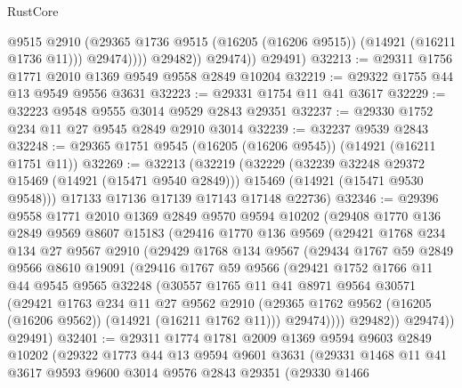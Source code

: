 \begin{lexlean}{RustCore}
\begin{coremodule}
                      @9515
                      @2910
                      (@29365 @1736 @9515 (@16205 (@16206 @9515)) (@14921 (@16211 @1736 @11)))
                      @29474))))
              @29482))
          @29474))
      @29491)
@32213 := @29311 @1756 @1771 @2010 @1369 @9549 @9558 @2849 @10204
@32219 := @29322 @1755 @44 @13 @9549 @9556 @3631
@32223 := @29331 @1754 @11 @41 @3617
@32229 := @32223 @9548 @9555 @3014 @9529 @2843 @29351
@32237 := @29330 @1752 @234 @11 @27 @9545 @2849 @2910 @3014
@32239 := @32237 @9539 @2843
@32248 := @29365 @1751 @9545 (@16205 (@16206 @9545)) (@14921 (@16211 @1751 @11))
@32269 := @32213
    (@32219
      (@32229
        (@32239 @32248 @29372 @15469 (@14921 (@15471 @9540 @2849)))
        @15469
        (@14921 (@15471 @9530 @9548)))
      @17133
      @17136
      @17139
      @17143
      @17148
      @22736)
@32346 := @29396
    @9558
    @1771
    @2010
    @1369
    @2849
    @9570
    @9594
    @10202
    (@29408
      @1770
      @136
      @2849
      @9569
      @8607
      @15183
      (@29416
        @1770
        @136
        @9569
        (@29421
          @1768
          @234
          @134
          @27
          @9567
          @2910
          (@29429
            @1768
            @134
            @9567
            (@29434
              @1767
              @59
              @2849
              @9566
              @8610
              @19091
              (@29416
                @1767
                @59
                @9566
                (@29421
                  @1752
                  @1766
                  @11
                  @44
                  @9545
                  @9565
                  @32248
                  (@30557
                    @1765
                    @11
                    @41
                    @8971
                    @9564
                    @30571
                    (@29421
                      @1763
                      @234
                      @11
                      @27
                      @9562
                      @2910
                      (@29365 @1762 @9562 (@16205 (@16206 @9562)) (@14921 (@16211 @1762 @11)))
                      @29474))))
              @29482))
          @29474))
      @29491)
@32401 := @29311
    @1774
    @1781
    @2009
    @1369
    @9594
    @9603
    @2849
    @10202
    (@29322
      @1773
      @44
      @13
      @9594
      @9601
      @3631
      (@29331
        @1468
        @11
        @41
        @3617
        @9593
        @9600
        @3014
        @9576
        @2843
        @29351
        (@29330
          @1466

\end{coremodule}
\end{lexlean}
